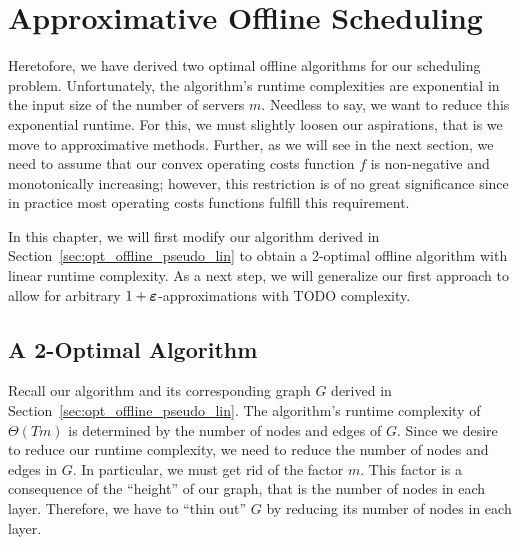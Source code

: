 
\chapter{Approximative Offline Scheduling}
Heretofore, we have derived two optimal offline algorithms for our scheduling problem. Unfortunately, the algorithm's runtime complexities are exponential in the input size of the number of servers $m$. Needless to say, we want to reduce this exponential runtime. For this, we must slightly loosen our aspirations, that is we move to approximative methods. Further, as we will see in the next section, we need to assume that our convex operating costs function $f$ is non-negative and monotonically increasing; however, this restriction is of no great significance since in practice most operating costs functions fulfill this requirement. 

In this chapter, we will first modify our algorithm derived in Section~\ref{sec:opt_offline_pseudo_lin} to obtain a 2-optimal offline algorithm with linear runtime complexity. As a next step, we will generalize our first approach to allow for arbitrary $1+\boldsymbol\varepsilon$-approximations with TODO complexity.

\section{A 2-Optimal Algorithm}
Recall our algorithm and its corresponding graph $G$ derived in Section~\ref{sec:opt_offline_pseudo_lin}. The algorithm's runtime complexity of $\Theta(Tm)$ is determined by the number of nodes and edges of $G$. Since we desire to reduce our runtime complexity, we need to reduce the number of nodes and edges in $G$. In particular, we must get rid of the factor $m$. This factor is a consequence of the ``height'' of our graph, that is the number of nodes in each layer. Therefore, we have to ``thin out'' $G$ by reducing its number of nodes in each layer.

